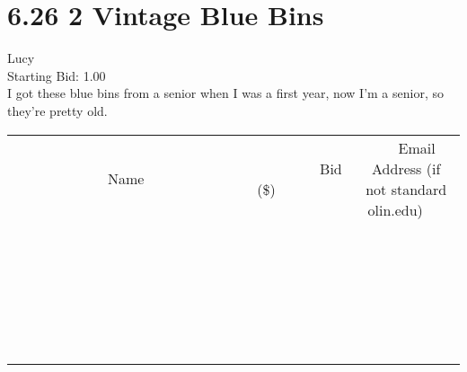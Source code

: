 \documentclass[11pt]{article}
\begin{document}
					\section*{6.26 2 Vintage Blue Bins}
					Lucy \\
					Starting Bid: 1.00 \\
					I got these blue bins from a senior when I was a first year, now I'm a senior, so they're pretty old. \\
					[6ex]
					\begin{tabular}{c c c}
						~~~~~~~~~~~~~Name~~~~~~~~~~~~~ & ~~~~~~~~~Bid (\$)~~~~~~~~~ & ~~~Email Address (if not standard olin.edu)~~~ \\
				
 & & \\
\hline
 & & \\
\hline
 & & \\
\hline
 & & \\
\hline
 & & \\
\hline
 & & \\
\hline
 & & \\
\hline
 & & \\
\hline
 & & \\
\hline
 & & \\
\hline
 & & \\
\hline
 & & \\
\hline
 & & \\
\hline
 & & \\
\hline
 & & \\
\hline
 & & \\
\hline
 & & \\
\hline
 & & \\
\hline
 & & \\
\hline
 & & \\
\hline
 & & \\
\hline
 & & \\
\hline
 & & \\
\hline
 & & \\
\hline
 & & \\
\hline
 & & \\
\hline
					\end{tabular}
					\clearpage
				
\end{document}
